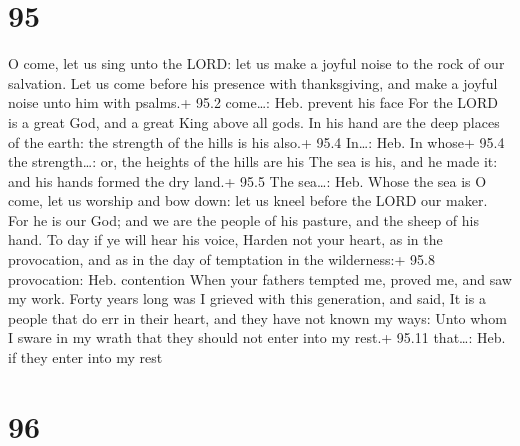\hypertarget{section-94}{%
\section{95}\label{section-94}}

 O come, let us sing unto the LORD: let us make a joyful
noise to the rock of our salvation.  Let us come before his
presence with thanksgiving, and make a joyful noise unto him with
psalms.+ 95.2 come\ldots: Heb. prevent his face  For the
LORD is a great God, and a great King above all gods.  In
his hand are the deep places of the earth: the strength of the hills is
his also.+ 95.4 In\ldots: Heb. In whose+ 95.4 the strength\ldots: or,
the heights of the hills are his  The sea is his, and he
made it: and his hands formed the dry land.+ 95.5 The sea\ldots: Heb.
Whose the sea is  O come, let us worship and bow down: let
us kneel before the LORD our maker.  For he is our God; and
we are the people of his pasture, and the sheep of his hand. To day if
ye will hear his voice,  Harden not your heart, as in the
provocation, and as in the day of temptation in the wilderness:+ 95.8
provocation: Heb. contention  When your fathers tempted me,
proved me, and saw my work.  Forty years long was I grieved
with this generation, and said, It is a people that do err in their
heart, and they have not known my ways:  Unto whom I sware
in my wrath that they should not enter into my rest.+ 95.11 that\ldots:
Heb. if they enter into my rest

\hypertarget{section-95}{%
\section{96}\label{section-95}}

